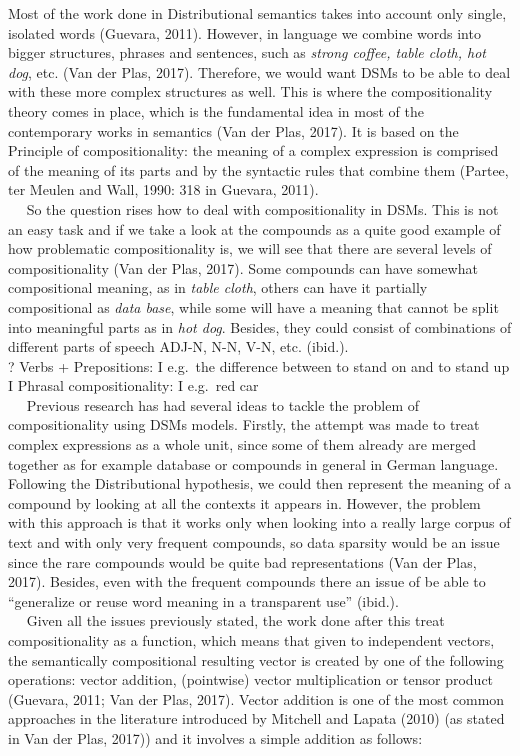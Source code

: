 \documentclass[11pt]{article}
\begin{document}
Most of the work done in Distributional semantics takes into account
only single, isolated words (Guevara, 2011). However, in language we
combine words into bigger structures, phrases and sentences, such as
\emph{strong coffee, table cloth, hot dog}, etc. (Van der Plas, 2017).
Therefore, we would want DSMs to be able to deal with these more complex
structures as well. This is where the compositionality theory comes in
place, which is the fundamental idea in most of the contemporary works
in semantics (Van der Plas, 2017). It is based on the Principle of
compositionality: the meaning of a complex expression is comprised of
the meaning of its parts and by the syntactic rules that combine them
(Partee, ter Meulen and Wall, 1990: 318 in Guevara, 2011).\\
   So the question rises how to deal with compositionality in DSMs. This
is not an easy task and if we take a look at the compounds as a quite
good example of how problematic compositionality is, we will see that
there are several levels of compositionality (Van der Plas, 2017). Some
compounds can have somewhat compositional meaning, as in \emph{table
cloth}, others can have it partially compositional as \emph{data base},
while some will have a meaning that cannot be split into meaningful
parts as in \emph{hot dog}. Besides, they could consist of combinations
of different parts of speech ADJ-N, N-N, V-N, etc. (ibid.).\\
? Verbs + Prepositions: I e.g.~the difference between to stand on and to
stand up I Phrasal compositionality: I e.g.~red car\\
   Previous research has had several ideas to tackle the problem of
compositionality using DSMs models. Firstly, the attempt was made to
treat complex expressions as a whole unit, since some of them already
are merged together as for example database or compounds in general in
German language. Following the Distributional hypothesis, we could then
represent the meaning of a compound by looking at all the contexts it
appears in. However, the problem with this approach is that it works
only when looking into a really large corpus of text and with only very
frequent compounds, so data sparsity would be an issue since the rare
compounds would be quite bad representations (Van der Plas, 2017).
Besides, even with the frequent compounds there an issue of be able to
``generalize or reuse word meaning in a transparent use'' (ibid.).\\
   Given all the issues previously stated, the work done after this
treat compositionality as a function, which means that given to
independent vectors, the semantically compositional resulting vector is
created by one of the following operations: vector addition, (pointwise)
vector multiplication or tensor product (Guevara, 2011; Van der Plas,
2017). Vector addition is one of the most common approaches in the
literature introduced by Mitchell and Lapata (2010) (as stated in Van
der Plas, 2017)) and it involves a simple addition as follows:
\end{document}
